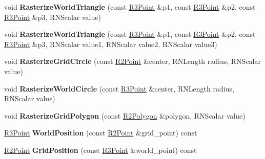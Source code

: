 \begin{DoxyCompactItemize}
\item 
void {\bfseries Rasterize\+World\+Triangle} (const \hyperlink{class_r3_point}{R3\+Point} \&p1, const \hyperlink{class_r3_point}{R3\+Point} \&p2, const \hyperlink{class_r3_point}{R3\+Point} \&p3, R\+N\+Scalar value)\hypertarget{class_r3_planar_grid_aa4755416dcd661ba27bb75e72f088948}{}\label{class_r3_planar_grid_aa4755416dcd661ba27bb75e72f088948}

\item 
void {\bfseries Rasterize\+World\+Triangle} (const \hyperlink{class_r3_point}{R3\+Point} \&p1, const \hyperlink{class_r3_point}{R3\+Point} \&p2, const \hyperlink{class_r3_point}{R3\+Point} \&p3, R\+N\+Scalar value1, R\+N\+Scalar value2, R\+N\+Scalar value3)\hypertarget{class_r3_planar_grid_a983a2462d8e5a1497642bf866ec7c307}{}\label{class_r3_planar_grid_a983a2462d8e5a1497642bf866ec7c307}

\item 
void {\bfseries Rasterize\+Grid\+Circle} (const \hyperlink{class_r2_point}{R2\+Point} \&center, R\+N\+Length radius, R\+N\+Scalar value)\hypertarget{class_r3_planar_grid_a59fc76ecbfd48c2371b40d888e311e08}{}\label{class_r3_planar_grid_a59fc76ecbfd48c2371b40d888e311e08}

\item 
void {\bfseries Rasterize\+World\+Circle} (const \hyperlink{class_r3_point}{R3\+Point} \&center, R\+N\+Length radius, R\+N\+Scalar value)\hypertarget{class_r3_planar_grid_affe8526897b9750f5181b23952fba052}{}\label{class_r3_planar_grid_affe8526897b9750f5181b23952fba052}

\item 
void {\bfseries Rasterize\+Grid\+Polygon} (const \hyperlink{class_r2_polygon}{R2\+Polygon} \&polygon, R\+N\+Scalar value)\hypertarget{class_r3_planar_grid_a91fba8c40d74cd3c0f03db9c76922255}{}\label{class_r3_planar_grid_a91fba8c40d74cd3c0f03db9c76922255}

\item 
\hyperlink{class_r3_point}{R3\+Point} {\bfseries World\+Position} (const \hyperlink{class_r2_point}{R2\+Point} \&grid\+\_\+point) const \hypertarget{class_r3_planar_grid_acfcb44622eccc585f2efa63c79a443fe}{}\label{class_r3_planar_grid_acfcb44622eccc585f2efa63c79a443fe}

\item 
\hyperlink{class_r2_point}{R2\+Point} {\bfseries Grid\+Position} (const \hyperlink{class_r3_point}{R3\+Point} \&world\+\_\+point) const \hypertarget{class_r3_planar_grid_ab5b35d3eb81aae45221a2e2b40ac8c1f}{}\label{class_r3_planar_grid_ab5b35d3eb81aae45221a2e2b40ac8c1f}


\end{DoxyCompactItemize}
